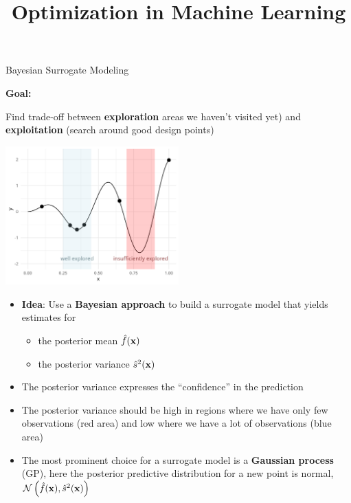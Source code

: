 \documentclass[11pt,compress,t,notes=noshow, xcolor=table]{beamer}
\title{Optimization in Machine Learning}
\date{}
\begin{document}


\begin{vbframe}{Bayesian Surrogate Modeling}

\textbf{Goal:}

Find trade-off between \textbf{exploration} areas we haven't visited yet) and \textbf{exploitation} (search around good design points)

\vspace{+.45cm}

\begin{center}
  \includegraphics[width = 0.5\textwidth]{figure_man/bayesian_loop_0.png}
\end{center}

\framebreak 

\begin{itemize}
\item \textbf{Idea}: Use a \textbf{Bayesian approach} to build a surrogate model that yields estimates for 
\begin{itemize}
  \item the posterior mean $\hat{f}(\mathbf{x})$
  \item the posterior variance $\hat{s}^2(\mathbf{x})$
\end{itemize}
\item The posterior variance expresses the \enquote{confidence} in the prediction
\item The posterior variance should be high in regions where we have only few observations (red area) and low where we have a lot of observations (blue area)
\item The most prominent choice for a surrogate model is a \textbf{Gaussian process} (GP), here the posterior predictive distribution for a new point is normal, $\mathcal{N}\left(\hat{f}(\mathbf{x}), \hat{s}^2(\mathbf{x})\right)$
\end{itemize}


\end{vbframe}
\end{document}
